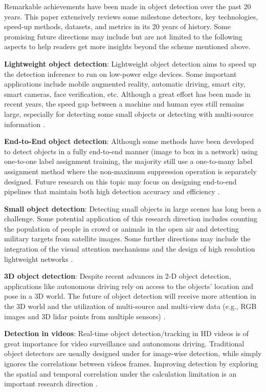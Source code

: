\documentclass[lettersize,journal]{IEEEtran}
\begin{document}
Remarkable achievements have been made in object detection over the past 20 years. This paper extensively reviews some milestone detectors, key technologies, speed-up methods, datasets, and metrics in its 20 years of history. Some promising future directions may include but are not limited to the following aspects to help readers get more insights beyond the scheme mentioned above.


\textbf{Lightweight object detection}: Lightweight object detection aims to speed up the detection inference to run on low-power edge devices. Some important applications include mobile augmented reality, automatic driving, smart city, smart cameras, face verification, etc. Although a great effort has been made in recent years, the speed gap between a machine and human eyes still remains large, especially for detecting some small objects or detecting with multi-source information \cite{bosquet2021stdnet, yang2022querydet}.



\textbf{End-to-End object detection}: Although some methods have been developed to detect objects in a fully end-to-end manner (image to box in a network) using one-to-one label assignment training, the majority still use a one-to-many label assignment method where the non-maximum suppression operation is separately designed. Future research on this topic may focus on designing end-to-end pipelines that maintain both high detection accuracy and efficiency \cite{sun2021makes}.


\textbf{Small object detection}: Detecting small objects in large scenes has long been a challenge. Some potential application of this research direction includes counting the population of people in crowd or animals in the open air and detecting military targets from satellite images. 
Some further directions may include the integration of the visual attention mechanisms and the design of high resolution lightweight networks \cite{zhou2021intelligent, cheng2022towards}.

\textbf{3D object detection}: Despite recent advances in 2-D object detection, applications like autonomous driving rely on access to the objects' location and pose in a 3D world. The future of object detection will receive more attention in the 3D world and the utilization of multi-source and multi-view data (e.g., RGB images and 3D lidar points from multiple sensors) \cite{wang2022detr3d, wang2022bridged}.

\textbf{Detection in videos}: Real-time object detection/tracking in HD videos is of great importance for video surveillance and autonomous driving. Traditional object detectors are usually designed under for image-wise detection, while simply ignores the correlations between videos frames. Improving detection by exploring the spatial and temporal correlation under the calculation limitation is an important research direction \cite{cheng2022implicit, zhou2022transvod}.
\end{document}
